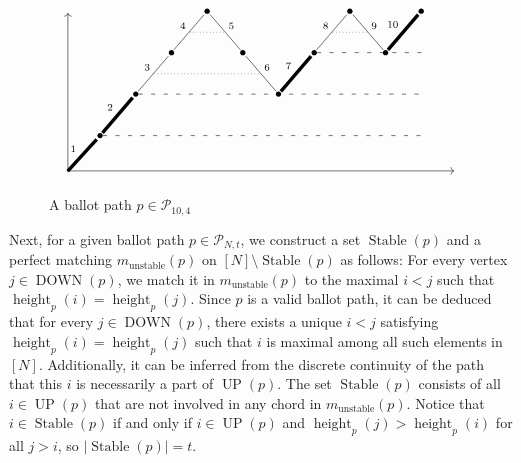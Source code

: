 \documentclass[11pt]{article}
\theoremstyle{definition}
\numberwithin{equation}{section}
\newcommand{\Stable}{\operatorname{Stable}}
\newcommand{\height}{\operatorname{height}}
\newcommand{\UP}{\operatorname{UP}}
\newcommand{\DOWN}{\operatorname{DOWN}}
\newcommand{\Pcal}{\mathcal{P}}
\begin{document}
\begin{figure}
    \centering
    \[\begin{tikzcd}[column sep=small]
	{} &&&& \bullet &&&& \bullet && \bullet \\
	&&& \bullet && \bullet && \bullet && \bullet & {} \\
	&& \bullet &&&& \bullet &&&& {} \\
	& \bullet &&&&&&&&& {} \\
	{} &&&&&&&&&&& {}
	\arrow[shorten >= -5pt, shorten <= -5pt, "2", no head, from=4-2, to=3-3, line width=2.5pt]
	\arrow[shorten >= -5pt, shorten <= -5pt, ""{name=0, anchor=center, inner sep=0}, "3", no head, from=3-3, to=2-4]
	\arrow[shorten >= -5pt, shorten <= -5pt, ""{name=1, anchor=center, inner sep=0}, "4", no head, from=2-4, to=1-5]
	\arrow[shorten >= -5pt, shorten <= -5pt, ""{name=2, anchor=center, inner sep=0}, "6", no head, from=2-6, to=3-7]
	\arrow[shorten >= -5pt, shorten <= -5pt, "7", no head, from=3-7, to=2-8, line width=2.5pt]
	\arrow[shorten >= -5pt, shorten <= -5pt, ""{name=3, anchor=center, inner sep=0}, "8", no head, from=2-8, to=1-9]
	\arrow[shorten >= -5pt, shorten <= -5pt, ""{name=4, anchor=center, inner sep=0}, "9", no head, from=1-9, to=2-10]
	\arrow[shorten >= -5pt, shorten <= -5pt, "10", no head, from=2-10, to=1-11, line width=2.5pt]
	\arrow[shorten >= -5pt, shorten <= -5pt, from=5-1, to=5-12]
	\arrow[shorten >= -5pt, shorten <= -2pt, from=5-1, to=1-1]
	\arrow[shorten >= -5pt, shorten <= -5pt, ""{name=5, anchor=center, inner sep=0}, "5", no head, from=1-5, to=2-6]
	\arrow[shorten >= -5pt, shorten <= -2pt, "1", no head, from=5-1, to=4-2, line width=2.5pt]
	\arrow[shorten >= -5pt, shorten <= -5pt, loosely dashed, no head, from=4-2, to=4-11]
	\arrow[shorten >= -5pt, shorten <= -5pt, loosely dashed, no head, from=3-3, to=3-11]
	\arrow[shorten >= -5pt, shorten <= -5pt, loosely dashed, no head, from=2-8, to=2-11]
	\arrow[dotted, no head, from=0, to=2]
	\arrow[dotted, no head, from=3, to=4]
	\arrow[dotted, no head, from=1, to=5]
    \end{tikzcd}\]
    \caption{A ballot path $p  \in \Pcal_{10,4}$}
    \label{fig:ballot path example}
\end{figure}

Next, for a given ballot path $p \in \Pcal_{N,t}$, we construct a set $\Stable(p)$ and a perfect matching $m_{\text{unstable}}(p)$ on $[N]\setminus\Stable(p)$ as follows: For every vertex $j \in \DOWN(p)$, we match it in $m_{\text{unstable}}(p)$ to the maximal $i < j$ such that $\height_p(i)=\height_p(j)$. Since $p$ is a valid ballot path, it can be deduced that for every $j \in \DOWN(p)$, there exists a unique $i<j$ satisfying $\height_p(i)=\height_p(j)$ such that $i$ is maximal among all such elements in $[N]$. Additionally, it can be inferred from the discrete continuity of the path that this $i$ is necessarily a part of $\UP(p)$. The set $\Stable(p)$ consists of all $i \in \UP(p)$ that are not involved in any chord in $m_{\text{unstable}}(p)$. Notice that $i \in \Stable(p)$ if and only if $i \in \UP(p)$ and $\height_p(j) > \height_p(i)$ for all $j>i$, so $\left|\Stable(p)\right| = t$.
\end{document}
